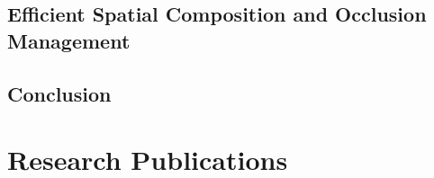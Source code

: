 \section{Efficient Spatial Composition and Occlusion Management}




\section{Conclusion}

\chapter{Research Publications}


%
%
%
%
%
%
%
%
%
%
%

